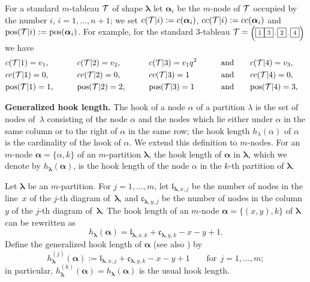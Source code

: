 \documentclass[pdftex]{sigma}
\newcommand{\pos}{{\mathrm{pos}}}
\newcommand{\cc}{cc}
\newcommand{\lam}{\boldsymbol{\lambda}}
\newcommand{\alm}{\boldsymbol{\alpha}}
\begin{document}
For a standard $m$-tableau ${\cal{T}}$ of shape $\lam$ let $\alm_i$ be the $m$-node of ${\cal{T}}$ occupied by the number $i$, $i=1,\dots,n+1$;
we set $c({\cal{T}}|i):=c(\alm_i)$, $\cc({\cal{T}}|i):=\cc(\alm_i)$ and $\pos({\cal{T}}|i):=\pos(\alm_i)$.
For example, for the standard $3$-tableau ${\cal{T}}^{^{\phantom{A}}}\!\!\!\!={\textrm{\tiny{$\left(
\fbox{\scriptsize{$1$}}\fbox{\scriptsize{$3$}}\, ,\fbox{\scriptsize{$2$}}\, ,\fbox{\scriptsize{$4$}}\right)$}}}$ we have
\begin{alignat*}{5}
& c({\cal{T}}|1)=v_1 ,\qquad && c({\cal{T}}|2)=v_2 ,\qquad && c({\cal{T}}|3)=v_1q^2\qquad && \text{and}\qquad  c({\cal{T}}|4)=v_3 ,& \\
& \cc({\cal{T}}|1)=0 ,\qquad && \cc({\cal{T}}|2)=0 ,\qquad  && \cc({\cal{T}}|3)=1\qquad && \text{and}\qquad \cc({\cal{T}}|4)=0 ,& \\
& \pos({\cal{T}}|1)=1 ,\qquad && \pos({\cal{T}}|2)=2 ,\qquad && \pos({\cal{T}}|3)=1\qquad &&\text{and}\qquad \pos({\cal{T}}|4)=3 ,&
  \end{alignat*}

{\bf Generalized hook length.} The hook of a node $\alpha$ of a partition $\lambda$ is the set of nodes of~$\lambda$ consisting of the node $\alpha$ and the nodes which lie either under $\alpha$ in the same column or to the right of $\alpha$ in the same row; the hook length $h_{\lambda}(\alpha)$ of $\alpha$ is the cardinality of the hook of $\alpha$.
We extend this def\/inition to $m$-nodes. For an $m$-node $\alm=\{\alpha,k\}$
of an $m$-partition $\lam$, the hook length of $\alm$ in $\lam$, which we denote by $h_{\lam}(\alm)$, is the hook length of the node $\alpha$ in the $k$-th partition of $\lam$.


Let $\lam$ be an $m$-partition. For $j=1,\dots,m$, let $\mathfrak{l}_{\lam,x,j}$ be the number of nodes in the line~$x$ of the $j$-th diagram of~$\lam$, and $\mathfrak{c}_{\lam,y,j}$ be the number of nodes in the column $y$ of the $j$-th diagram of~$\lam$. The hook length of an $m$-node $\alm=\{(x,y),k\}$ of $\lam$
can be rewritten as
\[
h_{\lam}(\alm)=\mathfrak{l}_{\lam,x,k}+\mathfrak{c}_{\lam,y,k}-x-y+1
 .
 \]
Def\/ine the generalized hook length of $\alm$ (see also \cite{CJ}) by
\[
h^{(j)}_{\lam}(\alm):=\mathfrak{l}_{\lam,x,j}+\mathfrak{c}_{\lam,y,k}-x-y+1\qquad  \text{for}\  \ j=1,\dots,m  ;
\]
in particular, $h^{(k)}_{\lam}(\alm)=h_{\lam}(\alm)$ is the usual hook length.
\end{document}

